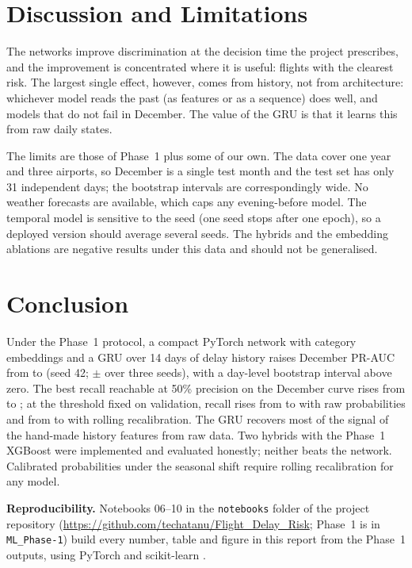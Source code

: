 \documentclass[conference]{IEEEtran}
\begin{document}
\section{Discussion and Limitations}
The networks improve discrimination at the decision time the project prescribes, and the
improvement is concentrated where it is useful: flights with the clearest risk. The
largest single effect, however, comes from history, not from architecture: whichever model
reads the past (as features or as a sequence) does well, and models that do not fail in
December. The value of the GRU is that it learns this from raw daily states.

The limits are those of Phase~1 plus some of our own. The data cover one year and three
airports, so December is a single test month and the test set has only 31 independent
days; the bootstrap intervals are correspondingly wide. No weather forecasts are
available, which caps any evening-before model. The temporal model is sensitive to the
seed (one seed stops after one epoch), so a deployed version should average several seeds.
The hybrids and the embedding ablations are negative results under this data and should
not be generalised.

\section{Conclusion}
Under the Phase~1 protocol, a compact PyTorch network with category embeddings and a GRU
over 14 days of delay history raises December PR-AUC from \XgboostTestPR{} to
\TemporalTestPR{} (seed 42; \TemporalSeedMean{} $\pm$ \TemporalSeedStd{} over three
seeds), with a day-level bootstrap interval above zero. The best recall reachable at 50\%
precision on the December curve rises from \XgboostRecallPfifty{} to
\TemporalRecallPfifty; at the threshold fixed on validation, recall rises from
\XgboostRawRecall{} to \TemporalRawRecall{} with raw probabilities and from
\XgboostRollRecall{} to \TemporalRollRecall{} with rolling recalibration. The GRU recovers
most of the signal of the hand-made history features from raw data. Two hybrids with the
Phase~1 XGBoost were implemented and evaluated honestly; neither beats the network.
Calibrated probabilities under the seasonal shift require rolling recalibration for any
model.

\textbf{Reproducibility.} Notebooks 06--10 in the \texttt{notebooks} folder of the project
repository (\url{https://github.com/techatanu/Flight_Delay_Risk}; Phase~1 is in
\texttt{ML\_Phase-1}) build every number, table and figure in this report from the
Phase~1 outputs, using PyTorch
\cite{paszke2019pytorch} and scikit-learn \cite{pedregosa2011}.
\end{document}
